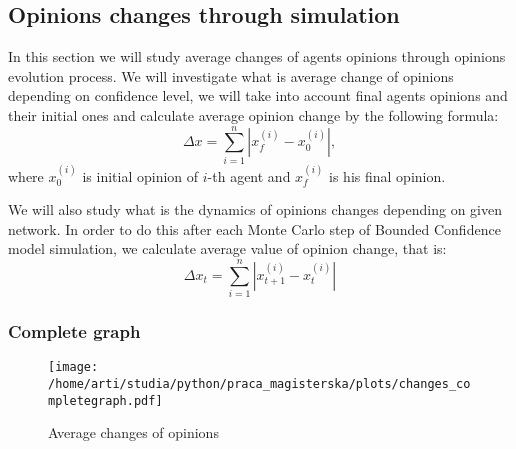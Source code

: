 \documentclass{article}
\begin{document}




\subsection{Opinions changes through simulation}
In this section we will study average changes of agents opinions through opinions evolution process. We will investigate what is average change of opinions depending on confidence level, we will take into account final agents opinions and their initial ones and calculate average opinion change by the following formula:
\begin{equation}
\Delta x = \sum_{i=1}^n \left|x_{f}^{(i)} - x_0^{(i)} \right|,
\end{equation}
where $x_0^{(i)}$ is initial opinion of $i$-th agent and $x_{f}^{(i)}$ is his final opinion.

\indent

We will also study what is the dynamics of opinions changes depending on given network. In order to do this after each Monte Carlo step of Bounded Confidence model simulation, we calculate average value of opinion change, that is:
\begin{equation}
\Delta x_t = \sum_{i=1}^n \left|x_{t+1}^{(i)} - x_t^{(i)} \right|
\end{equation}



\subsubsection{Complete graph}

\begin{figure}[H]
		\centering
		\texttt{[image: /home/arti/studia/python/praca\_magisterska/plots/changes\_completegraph.pdf]}
		\caption{Average changes of opinions}
\end{figure}
\end{document}
